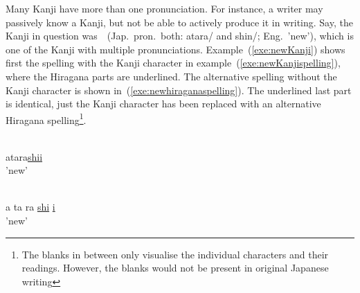 Many Kanji have more than one pronunciation.
For instance, a writer may passively know a Kanji, but not be able to actively 
produce it in writing. Say, the Kanji in question was~~(Jap.\ pron.\ 
both: atara/ and shin/; Eng.\ 'new'),
which is one of the Kanji with multiple pronunciations.
Example~(\ref{exe:newKanji})
shows first the spelling with the Kanji character 
in example~(\ref{exe:newKanjispelling}), where the Hiragana parts are underlined.
The alternative spelling without the Kanji character is shown
in~(\ref{exe:newhiraganaspelling}). The underlined last part is 
identical, just the Kanji character has been replaced with an alternative 
Hiragana spelling\footnote{The blanks in between only visualise the individual 
characters and their readings. However, the blanks would not be present in 
original Japanese writing}.

\begin{exe}
\ex \label{exe:newKanji}
\begin{xlist}
\ex \label{exe:newKanjispelling}
\gll {}\underline{} \\
atara\underline{shii} \\
\trans 'new'

\ex \label{exe:newhiraganaspelling}
\gll {}   \underline{} \underline{} \\
a ta ra \underline{shi} \underline{i} \\
\trans 'new'
\end{xlist}
\end{exe}


